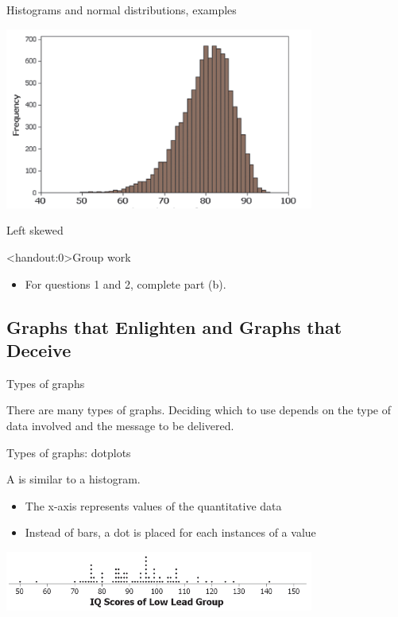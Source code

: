 \documentclass[handout]{beamer}
\begin{document}
\begin{frame}{Histograms and normal distributions, examples}

{\centering
\includegraphics[width=4in]{../images/ch02_hist_lskew}
\par}
\bigskip
\pause
\begin{block}{}
\centering \large Left skewed
\end{block}
\end{frame}


\begin{frame}<handout:0>{Group work}
\begin{block}{}
\large
\begin{itemize}
\item For questions 1 and 2, complete part (b).
\end{itemize}
\end{block}
\end{frame}


\subsection{Graphs that Enlighten and Graphs that Deceive}

\begin{frame}{Types of graphs}

\begin{block}{}
\large
There are many types of graphs. Deciding which to use depends on the type of data involved and the message to be delivered.
\end{block}
\end{frame}

\begin{frame}{Types of graphs: dotplots}
\begin{block}{}
A  is similar to a histogram. 
\begin{itemize}
\item The x-axis represents values of the quantitative data
\item Instead of bars, a dot is placed for each instances of a value
\end{itemize}
\end{block}
\bigskip
{\centering
\includegraphics[width=4in]{../images/ch02_dotplot}
\par}
\end{frame}
\end{document}
